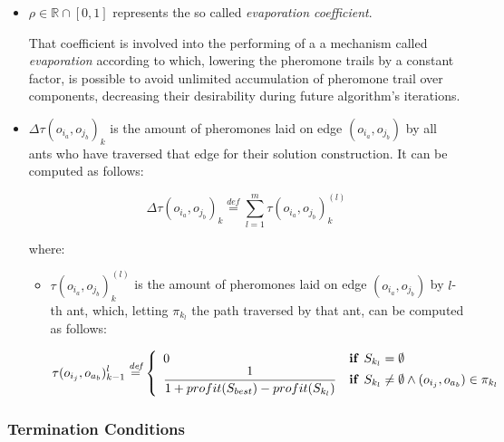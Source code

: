 \documentclass[12pt,a4paper]{report}
\newcommand{\mathDef}{\overset{\textit{def}}{=}}
\begin{document}
\begin{itemize}
	
	\item $\rho \in \mathbb{R} \cap \left[0,1\right]$ represents the so called \textit{evaporation coefficient}. 
	
	That coefficient is involved into the performing of a a mechanism called \textit{evaporation} according to which, lowering the pheromone trails by a constant factor, is possible to avoid unlimited accumulation of pheromone trail over components, decreasing their desirability during future algorithm's iterations.
	
	\item $\Delta \tau(o_{i_a}, o_{j_b})_{k}$ is the amount of pheromones laid on edge $(o_{i_a}, o_{j_b})$ by all ants who have traversed that edge for their solution construction. It can be computed as follows:
	
	\begin{equation}
		\Delta \tau(o_{i_a}, o_{j_b})_{k} \mathDef \sum_{l=1}^{m} \tau(o_{i_a}, o_{j_b})_k^{(l)}
	\end{equation}
	
	where: 
	
	\begin{itemize}
		\item $\tau(o_{i_a}, o_{j_b})_k^{(l)}$ is the amount of pheromones laid on edge $(o_{i_a}, o_{j_b})$ by $l$-th ant, which, letting $\pi_{k_l}$ the path traversed by that ant, can be computed as follows:
		
		\begin{equation}
			\tau(o_{i_j}, o_{a_b})_{k-1}^{l} \mathDef \left\{ 
			\begin{array}{ll}
				0 & \text{\textbf{if }} S_{k_l} = \emptyset \\ 
				\displaystyle \frac{1}{1 + profit(S_{best}) - profit(S_{k_l})} & \text{\textbf{if }} S_{k_l} \neq \emptyset \wedge (o_{i_j}, o_{a_b}) \in \pi_{k_l} \\ 
			\end{array} \right.
		\end{equation}
		
		
	\end{itemize}
\end{itemize}

\subsubsection{Termination Conditions}
\end{document}
